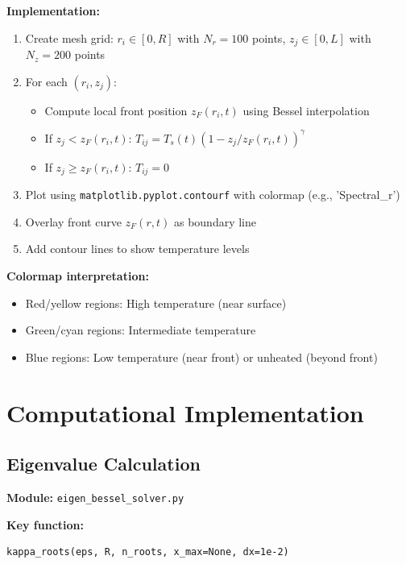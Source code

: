 \documentclass[12pt,a4paper]{article}
\begin{document}
\textbf{Implementation:}
\begin{enumerate}
    \item Create mesh grid: $r_i \in [0, R]$ with $N_r = 100$ points, $z_j \in [0, L]$ with $N_z = 200$ points
    
    \item For each $(r_i, z_j)$:
    \begin{itemize}
        \item Compute local front position $z_F(r_i, t)$ using Bessel interpolation
        \item If $z_j < z_F(r_i, t)$: $T_{ij} = T_s(t) \left(1 - z_j/z_F(r_i,t)\right)^\gamma$
        \item If $z_j \geq z_F(r_i, t)$: $T_{ij} = 0$
    \end{itemize}
    
    \item Plot using \texttt{matplotlib.pyplot.contourf} with colormap (e.g., 'Spectral\_r')
    
    \item Overlay front curve $z_F(r,t)$ as boundary line
    
    \item Add contour lines to show temperature levels
\end{enumerate}

\textbf{Colormap interpretation:}
\begin{itemize}
    \item Red/yellow regions: High temperature (near surface)
    \item Green/cyan regions: Intermediate temperature
    \item Blue regions: Low temperature (near front) or unheated (beyond front)
\end{itemize}

\section{Computational Implementation}

\subsection{Eigenvalue Calculation}

\textbf{Module:} \texttt{eigen\_bessel\_solver.py}

\textbf{Key function:}
\begin{verbatim}
kappa_roots(eps, R, n_roots, x_max=None, dx=1e-2)
\end{verbatim}
\end{document}
